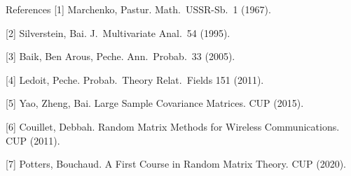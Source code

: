\documentclass{article}
\begin{document}
\begin{postercolumns}
\begin{postercolumn}
\posterblockgap

\begin{posterblock}[posterquiet]{References}
  [1] Marchenko, Pastur. Math.\ USSR-Sb.\ 1 (1967).

  [2] Silverstein, Bai. J.\ Multivariate Anal.\ 54 (1995).

  [3] Baik, Ben Arous, Peche. Ann.\ Probab.\ 33 (2005).

  [4] Ledoit, Peche. Probab.\ Theory Relat.\ Fields 151 (2011).

  [5] Yao, Zheng, Bai. Large Sample Covariance Matrices. CUP (2015).

  [6] Couillet, Debbah. Random Matrix Methods for Wireless Communications. CUP (2011).

  [7] Potters, Bouchaud. A First Course in Random Matrix Theory. CUP (2020).
\end{posterblock}
\end{postercolumn}

\end{postercolumns}
\end{document}
